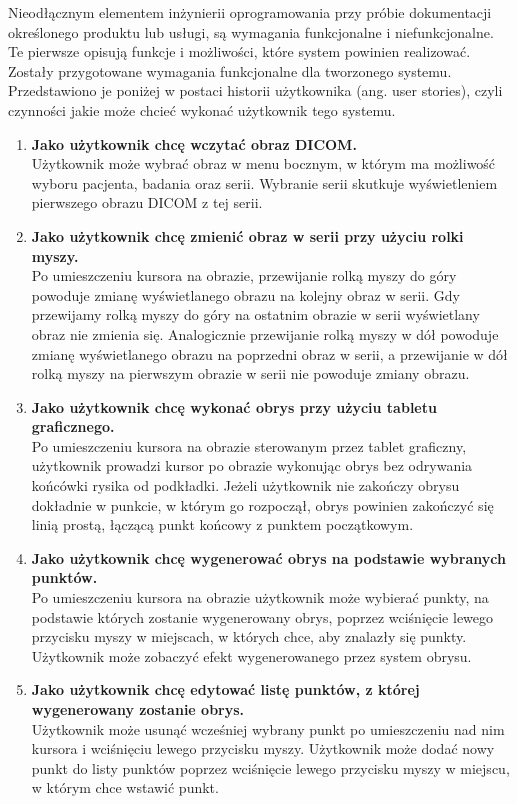 \documentclass[a4paper,11pt,twoside,openright]{report}
\theoremstyle{definition}
\begin{document}
Nieodłącznym elementem inżynierii oprogramowania przy próbie dokumentacji
określonego produktu lub usługi, są wymagania funkcjonalne i niefunkcjonalne.
Te pierwsze opisują funkcje i możliwości, które system powinien realizować.
Zostały przygotowane wymagania funkcjonalne dla tworzonego systemu. Przedstawiono
je poniżej w postaci historii użytkownika (ang. user stories), czyli czynności
jakie może chcieć wykonać użytkownik tego systemu.
\begin{enumerate}
\item \textbf {Jako użytkownik chcę wczytać obraz DICOM.} \\
Użytkownik może wybrać obraz w menu bocznym, w którym ma możliwość wyboru pacjenta,
badania oraz serii. Wybranie serii skutkuje wyświetleniem pierwszego obrazu DICOM z tej serii.

\item \textbf {Jako użytkownik chcę zmienić obraz w serii przy użyciu rolki myszy.} \\
Po umieszczeniu kursora na obrazie, przewijanie rolką myszy do góry powoduje zmianę
wyświetlanego obrazu na kolejny obraz w serii. Gdy przewijamy rolką myszy do góry
na ostatnim obrazie w serii wyświetlany obraz nie zmienia się. Analogicznie
przewijanie rolką myszy w dół powoduje zmianę wyświetlanego obrazu na poprzedni
obraz w serii, a przewijanie w dół rolką myszy na pierwszym obrazie w serii nie
powoduje zmiany obrazu.

\item \textbf {Jako użytkownik chcę wykonać obrys przy użyciu tabletu graficznego.} \\
Po umieszczeniu kursora na obrazie sterowanym przez tablet graficzny, użytkownik
prowadzi kursor po obrazie wykonując obrys bez odrywania końcówki rysika od podkładki.
Jeżeli użytkownik nie zakończy obrysu dokładnie w punkcie, w którym go rozpoczął,
obrys powinien zakończyć się linią prostą, łączącą punkt końcowy z punktem początkowym.

\item \textbf {Jako użytkownik chcę wygenerować obrys na podstawie wybranych punktów.} \\
Po umieszczeniu kursora na obrazie użytkownik może wybierać punkty, na podstawie
których zostanie wygenerowany obrys, poprzez wciśnięcie lewego przycisku myszy w
miejscach, w których chce, aby znalazły się punkty. Użytkownik może zobaczyć efekt
wygenerowanego przez system obrysu.

\item \textbf {Jako użytkownik chcę edytować listę punktów, z której wygenerowany zostanie obrys.} \\
Użytkownik może usunąć wcześniej wybrany punkt po umieszczeniu nad nim kursora i
wciśnięciu lewego przycisku myszy. Użytkownik może dodać nowy punkt do listy punktów
poprzez wciśnięcie lewego przycisku myszy w miejscu, w którym chce wstawić punkt.


\end{enumerate}
\end{document}

